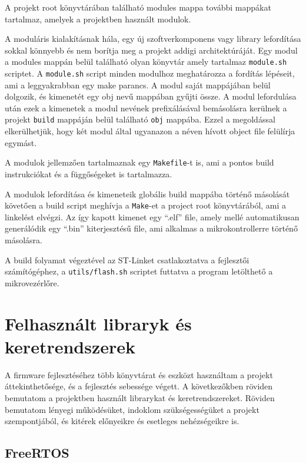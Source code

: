 A projekt root könyvtárában található modules mappa további mappákat tartalmaz,
amelyek a projektben használt modulok.

A moduláris kialakításnak hála, egy új szoftverkomponens vagy library lefordítása
sokkal könnyebb és nem borítja meg a projekt addigi architektúráját. Egy modul a
modules mappán belül található olyan könyvtár amely tartalmaz \verb|module.sh|
scriptet.  A \verb|module.sh| script minden modulhoz meghatározza a fordítás
lépéseit, ami a leggyakrabban egy make parancs. A modul saját mappájában belül
dolgozik, és kimenetét egy obj nevű mappában gyűjti össze. A modul lefordulása
után ezek a kimenetek a modul nevének prefixálásával bemásolásra kerülnek a
projekt \verb|build| mappáján belül található \verb|obj| mappába. Ezzel a megoldással
elkerülhetjük, hogy két modul által ugyanazon a néven hívott object file
felülírja egymást.

A modulok jellemzően tartalmaznak egy \verb|Makefile|-t is, ami a pontos build
instrukciókat és a függőségeket is tartalmazza.

A modulok lefordítása és kimeneteik globális build mappába történő másolását
követően a build script meghívja a \verb|Make|-et a project root könyvtárából, ami a
linkelést elvégzi. Az így kapott kimenet egy ``.elf'' file, amely mellé
automatikusan generálódik egy ``.bin'' kiterjesztésű file, ami alkalmas a
mikrokontrollerre történő másolásra.

\medskip

A build folyamat végeztével az ST-Linket csatlakoztatva a fejlesztői
számítógéphez, a \verb|utils/flash.sh| scriptet futtatva a program letölthető a
mikrovezérlőre. 

\section{Felhasznált libraryk és keretrendszerek}

A firmware fejlesztéséhez több könyvtárat és eszközt használtam a projekt
áttekinthetősége, és a fejlesztés sebessége végett. A következőkben röviden
bemutatom a projektben használt librarykat és keretrendszereket. Röviden
bemutatom lényegi működésüket, indoklom szükségességüket a projekt szempontjából,
és kitérek előnyeikre és esetleges nehézségeikre is.

\subsection{FreeRTOS}

